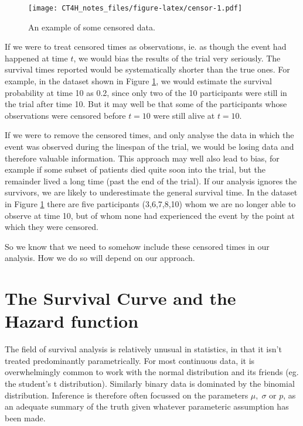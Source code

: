 \documentclass[
  openany]{book}
\theoremstyle{definition}
\theoremstyle{definition}
\theoremstyle{definition}
\theoremstyle{definition}
\theoremstyle{remark}
\begin{document}
\begin{figure}
\centering
\texttt{[image: CT4H\_notes\_files/figure-latex/censor-1.pdf]}
\caption{\label{fig:censor}An example of some censored data.}
\end{figure}

If we were to treat censored times as observations, ie. as though the event had happened at time \(t\), we would bias the results of the trial very seriously. The survival times reported would be systematically shorter than the true ones. For example, in the dataset shown in Figure \ref{fig:censor}, we would estimate the survival probability at time 10 as 0.2, since only two of the 10 participants were still in the trial after time 10. But it may well be that some of the participants whose observations were censored before \(t=10\) were still alive at \(t=10\).

If we were to remove the censored times, and only analyse the data in which the event was observed during the linespan of the trial, we would be losing data and therefore valuable information. This approach may well also lead to bias, for example if some subset of patients died quite soon into the trial, but the remainder lived a long time (past the end of the trial). If our analysis ignores the survivors, we are likely to underestimate the general survival time. In the dataset in Figure \ref{fig:censor} there are five participants (3,6,7,8,10) whom we are no longer able to observe at time 10, but of whom none had experienced the event by the point at which they were censored.

So we know that we need to somehow include these censored times in our analysis. How we do so will depend on our approach.

\hypertarget{survhaz}{%
\section{The Survival Curve and the Hazard function}\label{survhaz}}

The field of survival analysis is relatively unusual in statistics, in that it isn't treated predominantly parametrically. For most continuous data, it is overwhelmingly common to work with the normal distribution and its friends (eg. the student's t distribution). Similarly binary data is dominated by the binomial distribution. Inference is therefore often focussed on the parameters \(\mu,\;\sigma\) or \(p\), as an adequate summary of the truth given whatever parameteric assumption has been made.
\end{document}
